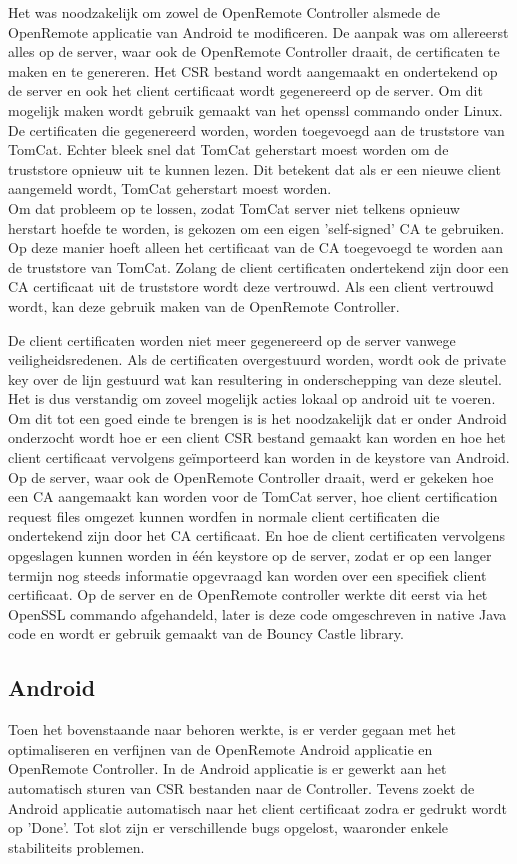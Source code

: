 \documentclass[]{article}
\begin{document}
Het was noodzakelijk om zowel de OpenRemote Controller alsmede de OpenRemote
applicatie van Android te modificeren. De aanpak was om allereerst alles op de
server, waar ook de OpenRemote Controller draait, de certificaten te maken en te
genereren. Het CSR bestand wordt aangemaakt en ondertekend op de server en ook
het client certificaat wordt gegenereerd op de server. Om dit mogelijk maken
wordt gebruik gemaakt van het openssl commando onder Linux.  De certificaten die
gegenereerd worden, worden toegevoegd aan de truststore van TomCat. Echter bleek
snel dat TomCat geherstart moest worden om de truststore opnieuw uit te 
kunnen lezen. Dit betekent dat als er een nieuwe client aangemeld wordt, TomCat
geherstart moest worden.
\\ Om dat probleem op te lossen, zodat TomCat server niet
telkens opnieuw herstart hoefde te worden, is gekozen om een eigen
'self-signed' CA te gebruiken. Op deze manier hoeft alleen het certificaat van
de CA toegevoegd te worden aan de truststore van TomCat.  Zolang de client
certificaten ondertekend zijn door een CA certificaat uit de
truststore wordt deze vertrouwd. Als een client vertrouwd wordt, kan deze
gebruik maken van de OpenRemote Controller.

De client certificaten worden niet meer gegenereerd op de server vanwege
veiligheidsredenen. Als de certificaten overgestuurd worden, wordt ook
de private key over de lijn gestuurd wat kan resultering in onderschepping van
deze sleutel. Het is dus verstandig om zoveel mogelijk acties lokaal op android uit te
voeren. Om dit tot een goed einde te brengen is is het noodzakelijk
dat er onder Android onderzocht wordt hoe er een client CSR bestand gemaakt kan
worden en hoe het client certificaat vervolgens ge\"importeerd kan worden in de
keystore van Android. Op de server, waar ook de OpenRemote Controller draait, werd
er gekeken hoe een CA aangemaakt kan worden voor de TomCat server, hoe client
certification request files omgezet kunnen wordfen in normale client certificaten die
ondertekend zijn door het CA certificaat. En hoe de client certificaten
vervolgens opgeslagen kunnen worden in \'e\'en keystore op de server, zodat er op een langer
termijn nog steeds informatie opgevraagd kan worden over een specifiek client certificaat.
Op de server en de OpenRemote controller werkte dit eerst via het OpenSSL
commando afgehandeld, later is deze code omgeschreven in native Java code en
wordt er gebruik gemaakt van de Bouncy Castle library.

\subsection{Android}
Toen het bovenstaande naar behoren werkte, is er verder gegaan met het
optimaliseren en verfijnen van de OpenRemote Android applicatie en OpenRemote
Controller. In de Android applicatie is er gewerkt aan het automatisch sturen
van CSR bestanden naar de Controller. Tevens zoekt de Android applicatie
automatisch naar het client certificaat zodra er gedrukt wordt op 'Done'. Tot
slot zijn er verschillende bugs opgelost, waaronder enkele stabiliteits
problemen.
\end{document}
